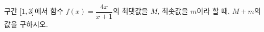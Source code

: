 구간 $[1{,}\mkern3mu\mathopen{}3]$에서 함수 $f(x)=\dfrac{4x}{x+1}$의 최댓값을 $M$, 최솟값을 $m$이라 할 때, $M+m$의 값을 구하시오.
